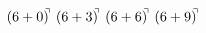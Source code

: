 \documentclass[preview]{standalone}
\begin{document}
\begin{align*}
(6+0)^{\hspace{-0.1cm}\urcorner} \ (6+3)^{\hspace{-0.1cm}\urcorner} \ (6+6)^{\hspace{-0.1cm}\urcorner} \ (6+9)^{\hspace{-0.1cm}\urcorner}
\end{align*}
\end{document}
